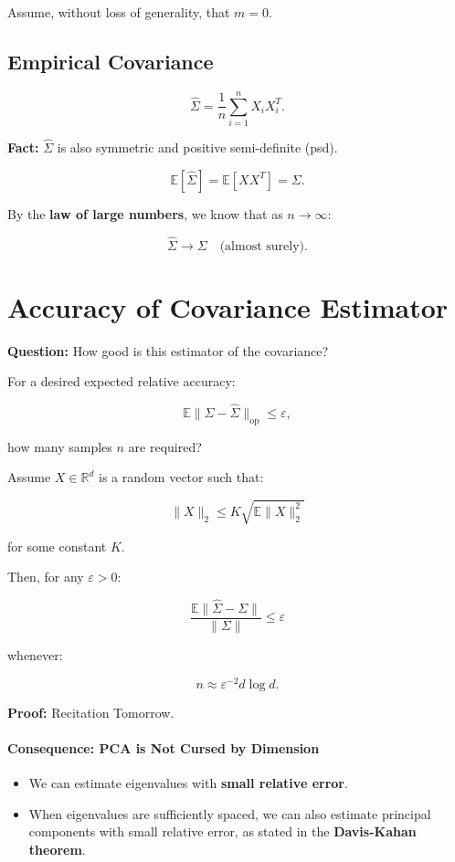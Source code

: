 \documentclass{article}
\begin{document}
Assume, without loss of generality, that \( m = 0 \).

\subsection*{Empirical Covariance}
\[
\hat{\Sigma} = \frac{1}{n} \sum_{i=1}^{n} X_i X_i^T.
\]

\textbf{Fact:} \( \hat{\Sigma} \) is also symmetric and positive semi-definite (psd).

\[
\mathbb{E}[\hat{\Sigma}] = \mathbb{E}[X X^T] = \Sigma.
\]

By the \textbf{law of large numbers}, we know that as \( n \to \infty \):

\[
\hat{\Sigma} \to \Sigma \quad \text{(almost surely)}.
\]

\section*{Accuracy of Covariance Estimator}

\textbf{Question:} How good is this estimator of the covariance?

For a desired expected relative accuracy:

\[
\mathbb{E} \|\Sigma - \hat{\Sigma} \|_{\text{op}} \leq \varepsilon,
\]

how many samples \( n \) are required?

\begin{theorem}[Vershynin]
    Assume \( X \in \mathbb{R}^d \) is a random vector such that:

\[
\|X\|_2 \leq K \sqrt{\mathbb{E} \|X\|_2^2}
\]

for some constant \( K \).

Then, for any \( \varepsilon > 0 \):

\[
\frac{\mathbb{E} \|\hat{\Sigma} - \Sigma\|}{\|\Sigma\|} \leq \varepsilon
\]

whenever:

\[
n \approx \varepsilon^{-2} d \log d.
\]

\end{theorem}

\textbf{Proof:} Recitation Tomorrow.


\paragraph{Consequence: PCA is Not Cursed by Dimension}

\begin{itemize}
    \item We can estimate eigenvalues with \textbf{small relative error}.
    \item When eigenvalues are sufficiently spaced, we can also estimate principal components with small relative error, as stated in the \textbf{Davis-Kahan theorem}.
\end{itemize}
\end{document}
